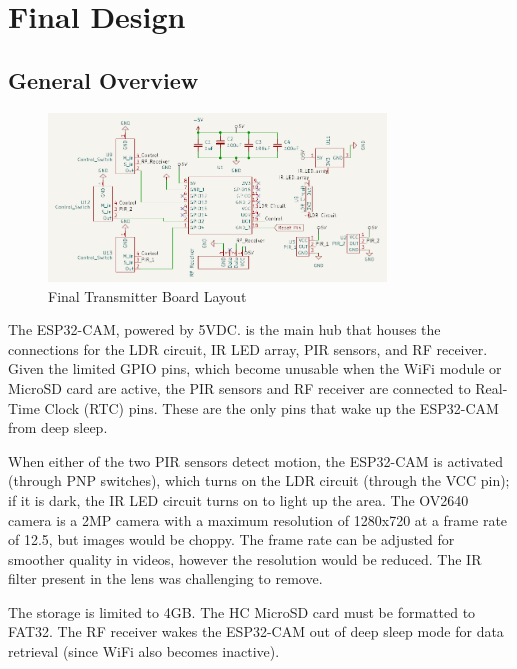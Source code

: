 \section{Final Design}

\subsection{General Overview}
\begin{figure}[h]
\centering
\includegraphics[width=0.8\textwidth]{Images/Transmitter_layout.png}
\caption{Final Transmitter Board Layout}
\label{fig:my_label}
\end{figure}

The ESP32-CAM, powered by 5VDC. is the main hub that houses the connections for the LDR circuit, IR LED array, PIR sensors, and RF receiver. 
Given the limited GPIO pins, which become unusable when the WiFi module or MicroSD card are active, the PIR sensors and RF receiver are connected to Real-Time Clock (RTC) pins. These are the only pins that wake up the ESP32-CAM from deep sleep. 

When either of the two PIR sensors detect motion, the ESP32-CAM is activated (through PNP switches), which turns on the LDR circuit (through the VCC pin); if it is dark, the IR LED circuit turns on to light up the area. The OV2640 camera is a 2MP camera with a maximum resolution of 1280x720 at a frame rate of 12.5, but images would be choppy. The frame rate can be adjusted for smoother quality in videos, however the resolution would be reduced. The IR filter present in the lens was challenging to remove. 

The storage is limited to 4GB. The HC MicroSD card must be formatted to FAT32. The RF receiver wakes the ESP32-CAM out of deep sleep mode for data retrieval (since WiFi also becomes inactive). 

